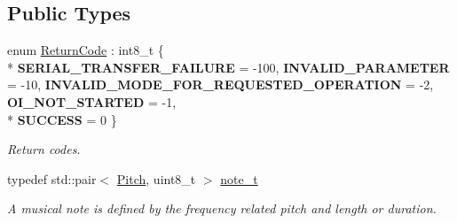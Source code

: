 \subsection*{Public Types}
\begin{DoxyCompactItemize}
\item 
\hypertarget{classroomba_1_1series500_1_1oi_1_1_o_i_encoder_ac2c8ad2f0306050926f89882d74696cc}{enum \hyperlink{classroomba_1_1series500_1_1oi_1_1_o_i_encoder_ac2c8ad2f0306050926f89882d74696cc}{Return\+Code} \+: int8\+\_\+t \{ \\*
{\bfseries S\+E\+R\+I\+A\+L\+\_\+\+T\+R\+A\+N\+S\+F\+E\+R\+\_\+\+F\+A\+I\+L\+U\+R\+E} = -\/100, 
{\bfseries I\+N\+V\+A\+L\+I\+D\+\_\+\+P\+A\+R\+A\+M\+E\+T\+E\+R} = -\/10, 
{\bfseries I\+N\+V\+A\+L\+I\+D\+\_\+\+M\+O\+D\+E\+\_\+\+F\+O\+R\+\_\+\+R\+E\+Q\+U\+E\+S\+T\+E\+D\+\_\+\+O\+P\+E\+R\+A\+T\+I\+O\+N} = -\/2, 
{\bfseries O\+I\+\_\+\+N\+O\+T\+\_\+\+S\+T\+A\+R\+T\+E\+D} = -\/1, 
\\*
{\bfseries S\+U\+C\+C\+E\+S\+S} = 0
 \}}\label{classroomba_1_1series500_1_1oi_1_1_o_i_encoder_ac2c8ad2f0306050926f89882d74696cc}

\begin{DoxyCompactList}\small\item\em Return codes. \end{DoxyCompactList}\item 
typedef std\+::pair$<$ \hyperlink{namespaceroomba_1_1series500_1_1oi_a1a8bf7d79627d7b145a833e43b8cd214}{Pitch}, uint8\+\_\+t $>$ \hyperlink{classroomba_1_1series500_1_1oi_1_1_o_i_encoder_ab4b7bf89bb873d838512791e339694fd}{note\+\_\+t}
\begin{DoxyCompactList}\small\item\em A musical note is defined by the frequency related pitch and length or duration. \end{DoxyCompactList}\end{DoxyCompactItemize}
